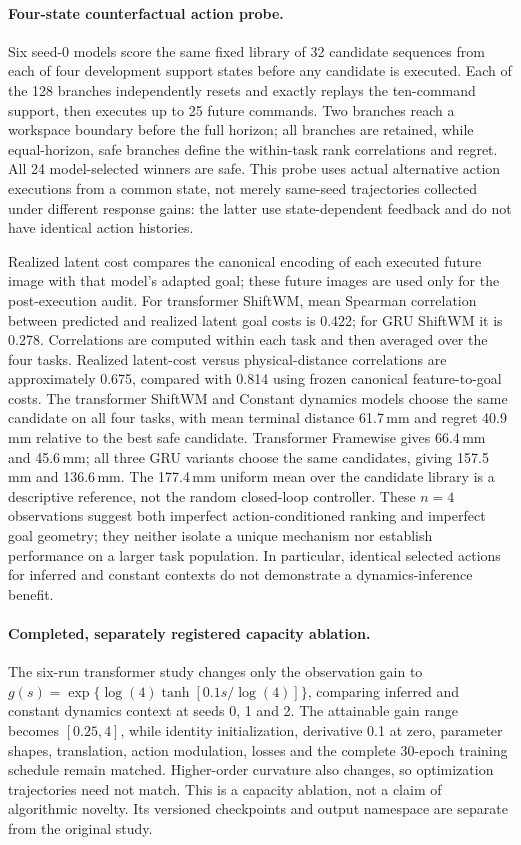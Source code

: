 \paragraph{Four-state counterfactual action probe.}
Six seed-0 models score the same fixed library of 32 candidate sequences
from each of four development support states before any candidate is
executed. Each of the 128 branches independently resets and exactly
replays the ten-command support, then executes up to 25 future commands.
Two branches reach a workspace boundary before the full horizon; all
branches are retained, while equal-horizon, safe branches define the
within-task rank correlations and regret. All 24 model-selected winners
are safe. This probe uses actual alternative action executions from a
common state, not merely same-seed trajectories collected under different
response gains: the latter use state-dependent feedback and do not have
identical action histories.

Realized latent cost compares the canonical encoding of each executed
future image with that model's adapted goal; these future images are used
only for the post-execution audit. For transformer ShiftWM, mean Spearman
correlation between predicted and realized latent goal costs is 0.422;
for GRU ShiftWM it is 0.278.
Correlations are computed within each task and then averaged over the
four tasks. Realized latent-cost versus physical-distance correlations
are approximately 0.675, compared with 0.814 using frozen canonical
feature-to-goal costs. The transformer ShiftWM and Constant dynamics
models choose the same candidate on all four tasks, with mean terminal
distance 61.7\,mm and regret 40.9\,mm relative to the best safe candidate.
Transformer Framewise gives 66.4\,mm and 45.6\,mm; all three GRU variants
choose the same candidates, giving 157.5\,mm and 136.6\,mm. The 177.4\,mm
uniform mean over the candidate library is a descriptive reference,
not the random closed-loop controller. These $n=4$ observations suggest
both imperfect action-conditioned ranking and imperfect goal geometry;
they neither isolate a unique mechanism nor establish performance on a
larger task population. In particular, identical selected actions for
inferred and constant contexts do not demonstrate a dynamics-inference
benefit.

\paragraph{Completed, separately registered capacity ablation.}
The six-run transformer study changes only the observation gain to
$g(s)=\exp\{\log(4)\tanh[0.1s/\log(4)]\}$, comparing inferred and constant
dynamics context at seeds 0, 1 and 2. The attainable gain range becomes
$[0.25,4]$, while identity initialization, derivative 0.1 at zero,
parameter shapes, translation, action modulation, losses and the complete
30-epoch training schedule remain matched. Higher-order curvature also
changes, so optimization trajectories need not match. This is a
capacity ablation, not a claim of algorithmic novelty. Its versioned
checkpoints and output namespace are separate from the original study.

